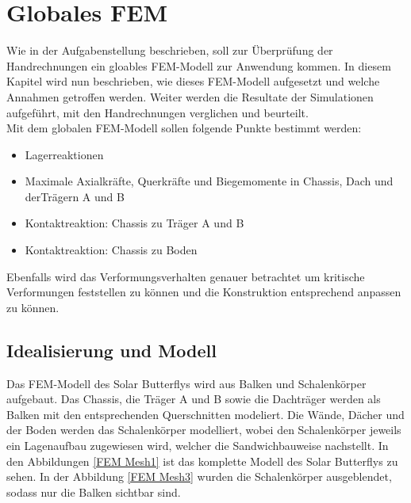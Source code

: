 \section{Globales FEM}
Wie in der Aufgabenstellung beschrieben, soll zur Überprüfung der Handrechnungen ein gloables FEM-Modell zur Anwendung kommen. In diesem Kapitel wird nun beschrieben, wie dieses FEM-Modell aufgesetzt und welche Annahmen getroffen werden. Weiter werden die Resultate der Simulationen aufgeführt, mit den Handrechnungen verglichen und beurteilt.\\

Mit dem globalen FEM-Modell sollen folgende Punkte bestimmt werden:
\begin{itemize}
  \item Lagerreaktionen
  \item Maximale Axialkräfte, Querkräfte und Biegemomente in Chassis, Dach und derTrägern A und B
  \item Kontaktreaktion: Chassis zu Träger A und B
  \item Kontaktreaktion: Chassis zu Boden
\end{itemize}

Ebenfalls wird das Verformungsverhalten genauer betrachtet um kritische Verformungen feststellen zu können und die Konstruktion entsprechend anpassen zu können.

\subsection{Idealisierung und Modell}
Das FEM-Modell des Solar Butterflys wird aus Balken und Schalenkörper aufgebaut. Das Chassis, die Träger A und B sowie die Dachträger werden als Balken mit den entsprechenden Querschnitten modeliert. Die Wände, Dächer und der Boden werden das Schalenkörper modelliert, wobei den Schalenkörper jeweils ein Lagenaufbau zugewiesen wird, welcher die Sandwichbauweise nachstellt. In den Abbildungen \ref{FEM Mesh1} ist das komplette Modell des Solar Butterflys zu sehen. In der Abbildung \ref{FEM Mesh3} wurden die Schalenkörper ausgeblendet, sodass nur die Balken sichtbar sind.

